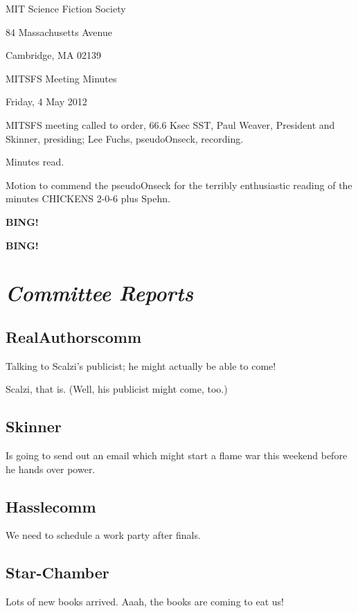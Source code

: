 \documentclass[10pt]{article}
\newcommand{\bing}{{\bf BING!} }
\newcommand{\goto}[1]{\bing \vskip 12pt \section*{{\em{#1}}}}
\newcommand{\ps}{ plus Spehn\xspace}
\newcommand{\skinner}{Paul Weaver, President and Skinner}
\newcommand{\onseck}{Lee Fuchs, pseudoOnseck}
\newcommand{\meetingdate}{Friday, 4 May 2012}
\begin{document}
\begin{center}

MIT Science Fiction Society

84 Massachusetts Avenue

Cambridge, MA 02139

\vspace{12pt}

MITSFS Meeting Minutes

\meetingdate

\end{center}

\vspace{18pt}

\setlength{\parskip}{6pt}

\noindent
MITSFS meeting called to order, 66.6 Ksec SST,
\skinner, presiding; \onseck, recording.

Minutes read.

Motion to commend the pseudoOnseck for the terribly enthusiastic reading 
of the minutes CHICKENS 2-0-6\ps.

\bing

\goto{Committee Reports}

\subsection*{RealAuthorscomm}

Talking to Scalzi's publicist; he might actually be able to come!

Scalzi, that is.  (Well, his publicist might come, too.)

\subsection*{Skinner}

Is going to send out an email which might start a flame war this weekend before 
he hands over power.

\subsection*{Hasslecomm}

We need to schedule a work party after finals.

\subsection*{Star-Chamber}

Lots of new books arrived.  Aaah, the books are coming to eat us!
\end{document}
